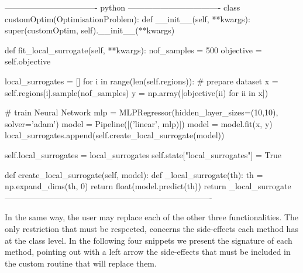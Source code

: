 \begin{Code}
---------------------------------- python ----------------------------------
class customOptim(OptimisationProblem):
    def __init__(self, **kwargs):
        super(customOptim, self).__init__(**kwargs)
        
    def fit_local_surrogate(self, **kwargs):
        nof_samples = 500
        objective = self.objective

        local_surrogates = []
        for i in range(len(self.regions)):
            # prepare dataset
            x = self.regions[i].sample(nof_samples)
            y = np.array([objective(ii) for ii in x])

            # train Neural Network
            mlp = MLPRegressor(hidden_layer_sizes=(10,10), solver='adam')
            model = Pipeline([('linear', mlp)])
            model = model.fit(x, y)
            local_surrogates.append(self.create_local_surrogate(model))

        self.local_surrogates = local_surrogates
        self.state["local_surrogates"] = True

    def create_local_surrogate(self, model):
        def _local_surrogate(th):
            th = np.expand_dims(th, 0)
            return float(model.predict(th))
        return _local_surrogate
----------------------------------------------------------------------------    
\end{Code}

In the same way, the user may replace each of the other three
functionalities. The only restriction that must be respected, concerns
the side-effects each method has at the 
class level. In the following four snippets we present the signature
of each method, pointing out with a left arrow the side-effects that
must be included in the custom routine that will replace them.


